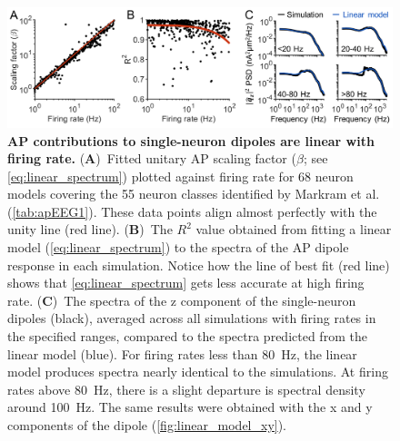 \begin{figure}
	\centering
	\includegraphics[width=13.2cm]{Figures/chapter3/figure2.png}
    
    \caption{\textbf{AP contributions to single-neuron dipoles are linear with firing rate.} (\textbf{A})~Fitted unitary AP scaling factor ($\beta$; see {\ref{eq:linear_spectrum}}) plotted against firing rate for 68 neuron models covering the 55 neuron classes identified by Markram et al. \cite{Markram2015} (\autoref{tab:apEEG1}). These data points align almost perfectly with the unity line (red line). (\textbf{B})~The $R^2$ value obtained from fitting a linear model ({\ref{eq:linear_spectrum}}) to the spectra of the AP dipole response in each simulation. Notice how the line of best fit (red line) shows that {\ref{eq:linear_spectrum}} gets less accurate at high firing rate. (\textbf{C})~The spectra of the z component of the single-neuron dipoles (black), averaged across all simulations with firing rates in the specified ranges, compared to the spectra predicted from the linear model (blue). For firing rates less than 80~\unit{\hertz}, the linear model produces spectra nearly identical to the simulations. At firing rates above 80~\unit{\hertz}, there is a slight departure is spectral density around 100~\unit{\hertz}. The same results were obtained with the x and y components of the dipole ({\autoref{fig:linear_model_xy}}).} 
    \label{fig:all_linear_model}
\end{figure}


